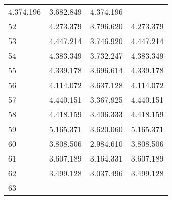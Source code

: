 \begin{tabular}{llll}
  \multicolumn{1}{|r}{4.374.196} &
  \multicolumn{1}{r}{3.682.849} &
  \multicolumn{1}{r}{4.374.196} \\
\multicolumn{1}{l}{\hspace{1em}52} &
  \multicolumn{1}{|r}{4.273.379} &
  \multicolumn{1}{r}{3.796.620} &
  \multicolumn{1}{r}{4.273.379} \\
\multicolumn{1}{l}{\hspace{1em}53} &
  \multicolumn{1}{|r}{4.447.214} &
  \multicolumn{1}{r}{3.746.920} &
  \multicolumn{1}{r}{4.447.214} \\
\multicolumn{1}{l}{\hspace{1em}54} &
  \multicolumn{1}{|r}{4.383.349} &
  \multicolumn{1}{r}{3.732.247} &
  \multicolumn{1}{r}{4.383.349} \\
\multicolumn{1}{l}{\hspace{1em}55} &
  \multicolumn{1}{|r}{4.339.178} &
  \multicolumn{1}{r}{3.696.614} &
  \multicolumn{1}{r}{4.339.178} \\
\multicolumn{1}{l}{\hspace{1em}56} &
  \multicolumn{1}{|r}{4.114.072} &
  \multicolumn{1}{r}{3.637.128} &
  \multicolumn{1}{r}{4.114.072} \\
\multicolumn{1}{l}{\hspace{1em}57} &
  \multicolumn{1}{|r}{4.440.151} &
  \multicolumn{1}{r}{3.367.925} &
  \multicolumn{1}{r}{4.440.151} \\
\multicolumn{1}{l}{\hspace{1em}58} &
  \multicolumn{1}{|r}{4.418.159} &
  \multicolumn{1}{r}{3.406.333} &
  \multicolumn{1}{r}{4.418.159} \\
\multicolumn{1}{l}{\hspace{1em}59} &
  \multicolumn{1}{|r}{5.165.371} &
  \multicolumn{1}{r}{3.620.060} &
  \multicolumn{1}{r}{5.165.371} \\
\multicolumn{1}{l}{\hspace{1em}60} &
  \multicolumn{1}{|r}{3.808.506} &
  \multicolumn{1}{r}{2.984.610} &
  \multicolumn{1}{r}{3.808.506} \\
\multicolumn{1}{l}{\hspace{1em}61} &
  \multicolumn{1}{|r}{3.607.189} &
  \multicolumn{1}{r}{3.164.331} &
  \multicolumn{1}{r}{3.607.189} \\
\multicolumn{1}{l}{\hspace{1em}62} &
  \multicolumn{1}{|r}{3.499.128} &
  \multicolumn{1}{r}{3.037.496} &
  \multicolumn{1}{r}{3.499.128} \\
\multicolumn{1}{l}{\hspace{1em}63} &

\end{tabular}

